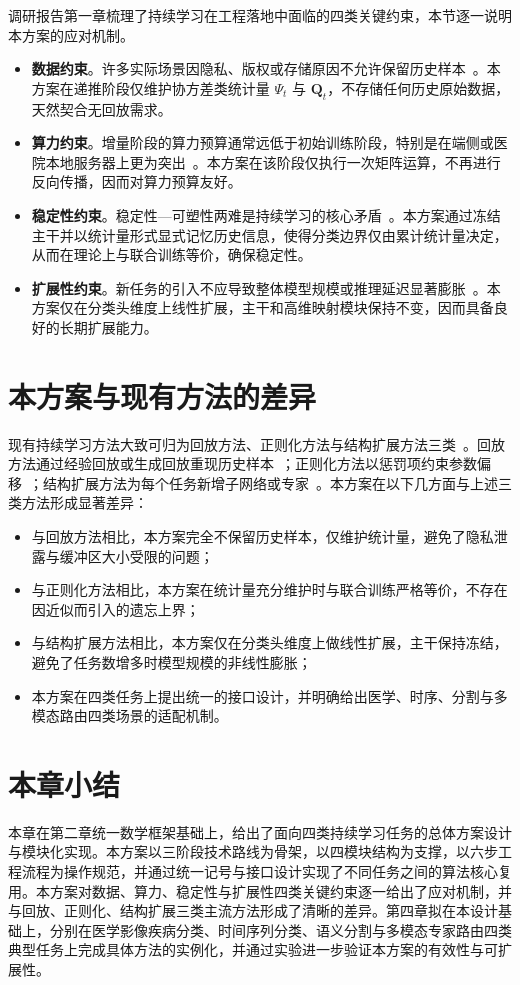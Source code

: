 调研报告第一章梳理了持续学习在工程落地中面临的四类关键约束，本节逐一说明本方案的应对机制。
\begin{itemize}
    \item \textbf{数据约束}。许多实际场景因隐私、版权或存储原因不允许保留历史样本~\citep{de2021continual,wang2024survey}。本方案在递推阶段仅维护协方差类统计量 $\Psi_t$ 与 $\mathbf{Q}_t$，不存储任何历史原始数据，天然契合无回放需求。
    \item \textbf{算力约束}。增量阶段的算力预算通常远低于初始训练阶段，特别是在端侧或医院本地服务器上更为突出~\citep{souza2020challenges}。本方案在该阶段仅执行一次矩阵运算，不再进行反向传播，因而对算力预算友好。
    \item \textbf{稳定性约束}。稳定性—可塑性两难是持续学习的核心矛盾~\citep{kirkpatrick2017ewc,li2017learning}。本方案通过冻结主干并以统计量形式显式记忆历史信息，使得分类边界仅由累计统计量决定，从而在理论上与联合训练等价，确保稳定性。
    \item \textbf{扩展性约束}。新任务的引入不应导致整体模型规模或推理延迟显著膨胀~\citep{rusu2016progressive,mallya2018piggyback}。本方案仅在分类头维度上线性扩展，主干和高维映射模块保持不变，因而具备良好的长期扩展能力。
\end{itemize}

\section{本方案与现有方法的差异}

现有持续学习方法大致可归为回放方法、正则化方法与结构扩展方法三类~\citep{wang2024survey,de2021continual}。回放方法通过经验回放或生成回放重现历史样本~\citep{rebuffi2017icarl,shin2017continual,buzzega2020dark}；正则化方法以惩罚项约束参数偏移~\citep{kirkpatrick2017ewc,li2017learning,aljundi2018memory}；结构扩展方法为每个任务新增子网络或专家~\citep{rusu2016progressive,mallya2018piggyback,wang2022dualprompt}。本方案在以下几方面与上述三类方法形成显著差异：
\begin{itemize}
    \item 与回放方法相比，本方案完全不保留历史样本，仅维护统计量，避免了隐私泄露与缓冲区大小受限的问题；
    \item 与正则化方法相比，本方案在统计量充分维护时与联合训练严格等价，不存在因近似而引入的遗忘上界；
    \item 与结构扩展方法相比，本方案仅在分类头维度上做线性扩展，主干保持冻结，避免了任务数增多时模型规模的非线性膨胀；
    \item 本方案在四类任务上提出统一的接口设计，并明确给出医学、时序、分割与多模态路由四类场景的适配机制。
\end{itemize}

\section{本章小结}

本章在第二章统一数学框架基础上，给出了面向四类持续学习任务的总体方案设计与模块化实现。本方案以三阶段技术路线为骨架，以四模块结构为支撑，以六步工程流程为操作规范，并通过统一记号与接口设计实现了不同任务之间的算法核心复用。本方案对数据、算力、稳定性与扩展性四类关键约束逐一给出了应对机制，并与回放、正则化、结构扩展三类主流方法形成了清晰的差异。第四章拟在本设计基础上，分别在医学影像疾病分类、时间序列分类、语义分割与多模态专家路由四类典型任务上完成具体方法的实例化，并通过实验进一步验证本方案的有效性与可扩展性。
